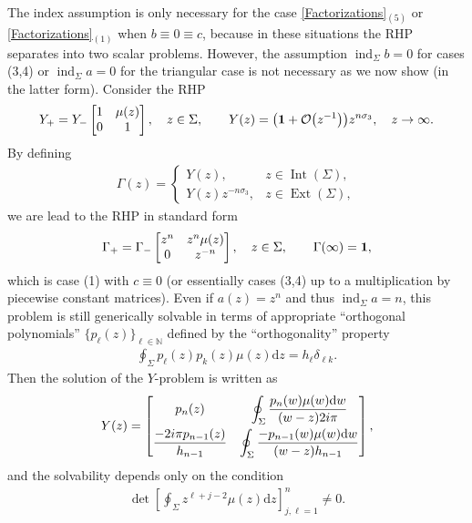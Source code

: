 \documentclass[pdftex]{sigma}
\numberwithin{equation}{section}
\def \ds{\displaystyle}
\def \s{\sigma}
\def \G{\Gamma}
\def\N{{\mathbb N}}
\def\d{\mathrm d}
\def\1{{\bf 1}}
\begin{document}
\begin{Remark}
The index assumption is only necessary for the case \eqref{Factorizations}$_{{(5)}}$ or \eqref{Factorizations}$_{{(1)}}$ when $b\equiv 0 \equiv c$, because in these situations the RHP separates into two scalar problems. However, the assumption $\operatorname{ind}_\Sigma b=0$ for cases (3,4) or $\operatorname{ind}_\Sigma a =0$ for the triangular case is not necessary as we now show (in the latter form). Consider the RHP
\begin{gather*}
Y_+ = Y_- \left[\begin{matrix}
1 & \mu(z)\\
0& 1
\end{matrix}\right], \quad z\in \Sigma,\qquad
Y(z) = \big(\1 + \mathcal O\big(z^{-1}\big)\big) z^{n\s_3}, \quad z\to\infty.
\end{gather*}
By def\/ining
\begin{gather*}\G(z) =
\begin{cases}
Y(z), & z\in \operatorname{Int}(\Sigma),\\
 Y(z) z^{-n\s_3}, & z\in \operatorname{Ext}(\Sigma),
\end{cases}
\end{gather*}
we are lead to the RHP in standard form
\begin{gather*}
\G_+ = \G_- \left[\begin{matrix}
z^n & z^n\mu(z)\\
0& z^{-n}
\end{matrix}\right], \quad z\in \Sigma,\qquad \G(\infty) =\1,
\end{gather*}
which is case (1) with $c\equiv 0$ (or essentially cases (3,4) up to a multiplication by piecewise constant matrices). Even if $a(z) =z^n$ and thus $\operatorname{ind}_\Sigma a = n$, this problem is still generically solvable in terms of appropriate ``orthogonal polynomials'' $\{p_\ell(z)\}_{\ell\in \N}$ def\/ined by the ``orthogonality'' property
\begin{gather*}
\oint_{\Sigma} p_\ell(z) p_k(z) \mu(z)\d z = h_\ell \delta_{\ell k}.
\end{gather*}
Then the solution of the $Y$-problem is written as
\begin{gather*}
Y(z) = \left[
\begin{matrix}
p_n(z) & \ds \oint_{\Sigma} \frac {p_n(w)\mu(w)\d w}{(w-z)2i\pi}\vspace{1mm}\\
\ds \frac{-2i\pi p_{n-1}(z)}{h_{n-1}} & \ds \oint_{\Sigma} \frac {-p_{n-1}(w)\mu(w)\d w}{(w-z) h_{n-1}}
\end{matrix}
\right],
\end{gather*}
and the solvability depends only on the condition \cite{Chihara}
\begin{gather*}
\det\left[\oint_{\Sigma} z^{\ell+j-2} \mu(z) \d z \right]_{j,\ell=1}^{n} \neq 0.
\end{gather*}
\end{Remark}
\end{document}
